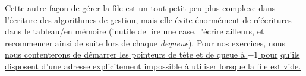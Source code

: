 \documentclass[11pt,a4paper]{article}
\begin{document}
\bigskip

Cette autre façon de gérer la file est un tout petit peu plus complexe dans l'écriture des algorithmes de gestion, mais elle évite énormément de réécritures dans le tableau/en mémoire (inutile de lire une case, l'écrire ailleurs, et recommencer ainsi de suite lors de chaque \textit{dequeue}).
\linebreak
\underline{Pour nos exercices, nous nous contenterons de démarrer les pointeurs de tête et de queue à $ -1 $ pour}
\linebreak
\underline{qu'ils disposent d'une adresse explicitement impossible à utiliser lorsque la file est vide.}

\bigskip

\end{document}
